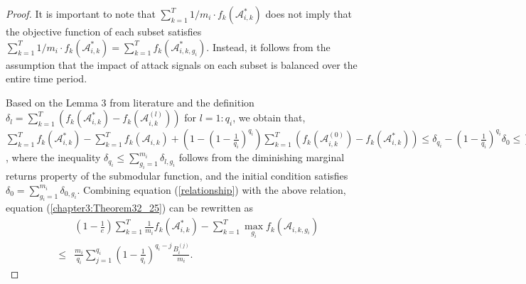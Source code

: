 \begin{proof}
It is important to note that $\sum_{k=1}^T 1/{m_i} \cdot f_k\left( \mathcal{A}_{i,k}^{*}\right)$ does not imply that the objective function of each subset satisfies $\sum_{k=1}^T 1/{m_i} \cdot f_k\left( \mathcal{A}_{i,k}^{*}\right) = \sum_{k=1}^T f_k\left( \mathcal{A}_{i,k,g_i}^{*}\right)$. Instead, it follows from the assumption that the impact of attack signals on each subset is balanced over the entire time period.

Based on the Lemma 3 from literature \cite{matsuoka2021tracking} and the definition $\delta_l = \sum_{k=1}^T \left( f_k( \mathcal{A}_{i,k}^{*} ) - f_k ( \mathcal{A}_{i,k}^{(l)} ) \right)$ for $l=1:q_i$, we obtain that,
$\sum_{k=1}^T{f_k\left( \mathcal{A}_{i,k}^{*} \right)} - \sum_{k=1}^T{f_k \left( \mathcal{A}_{i,k} \right)} + (1 - (1 - \frac{1}{q_i})^{q_i})\sum_{k=1}^T{(f_k( \mathcal {A}_{i,k}^{(0)} ) - f_k( \mathcal{A}_{i,k}^{*} ))} \le \delta_{q_i} - (1 - \frac {1}{q_i})^{q_i} \delta_0 \le \sum^{m_i}_{g_i=1} \delta_{l,g_i} - (1 - \frac{1}{q_i})^{q_i} \sum^{m_i}_{g_i=1} \delta_{0,g_i}
$, where the inequality $\delta_{q_i} \le \sum^{m_i}_{g_i=1} \delta_{l,g_i}$ follows from the diminishing marginal returns property of the submodular function, and the initial condition satisfies $\delta_0 = \sum_{g_i=1}^{m_i} \delta_{0,g_i}$. Combining equation (\ref{relationship}) with the above relation, equation (\ref{chapter3:Theorem32_25}) can be rewritten as
\begin{eqnarray}
   &&( 1 - \frac{1}{e} ) \sum_{k=1}^T{\frac{1}{m_i} f_k\left( \mathcal{A}_{i,k}^{*} \right)} - \sum_{k=1}^T{\max_{g_i} f_k( \mathcal{A}_{i,k,g_i} )}\nonumber\\
&\le& \frac{m_i}{q_i} \sum_{j=1}^{q_i} (1 - \frac{1}{q_i})^{q_i-j} \frac{B_i^{(j)}}{m_i}. 
\end{eqnarray}




\end{proof}
